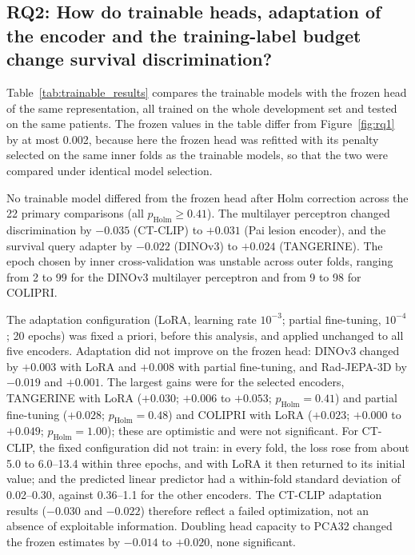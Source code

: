 \subsection{RQ2: How do trainable heads, adaptation of the encoder and the training-label budget change survival discrimination?}\label{sec:res-adaptation}

Table~\ref{tab:trainable_results} compares the trainable models with the frozen head of the same representation, all trained on the whole development set and tested on the same patients. The frozen values in the table differ from Figure~\ref{fig:rq1} by at most 0.002, because here the frozen head was refitted with its penalty selected on the same inner folds as the trainable models, so that the two were compared under identical model selection.


No trainable model differed from the frozen head after Holm correction across the 22 primary comparisons (all $p_\mathrm{Holm}\geq0.41$). The multilayer perceptron changed discrimination by $-0.035$ (CT-CLIP) to $+0.031$ (Pai lesion encoder), and the survival query adapter by $-0.022$ (DINOv3) to $+0.024$ (TANGERINE). The epoch chosen by inner cross-validation was unstable across outer folds, ranging from 2 to 99 for the DINOv3 multilayer perceptron and from 9 to 98 for COLIPRI.

The adaptation configuration (LoRA, learning rate $10^{-3}$; partial fine-tuning, $10^{-4}$; 20 epochs) was fixed a priori, before this analysis, and applied unchanged to all five encoders. Adaptation did not improve on the frozen head: DINOv3 changed by $+0.003$ with LoRA and $+0.008$ with partial fine-tuning, and Rad-JEPA-3D by $-0.019$ and $+0.001$. The largest gains were for the selected encoders, TANGERINE with LoRA ($+0.030$; $+0.006$ to $+0.053$; $p_\mathrm{Holm}=0.41$) and partial fine-tuning ($+0.028$; $p_\mathrm{Holm}=0.48$) and COLIPRI with LoRA ($+0.023$; $+0.000$ to $+0.049$; $p_\mathrm{Holm}=1.00$); these are optimistic and were not significant. For CT-CLIP, the fixed configuration did not train: in every fold, the loss rose from about 5.0 to 6.0--13.4 within three epochs, and with LoRA it then returned to its initial value; and the predicted linear predictor had a within-fold standard deviation of 0.02--0.30, against 0.36--1.1 for the other encoders. The CT-CLIP adaptation results ($-0.030$ and $-0.022$) therefore reflect a failed optimization, not an absence of exploitable information. Doubling head capacity to PCA32 changed the frozen estimates by $-0.014$ to $+0.020$, none significant.

